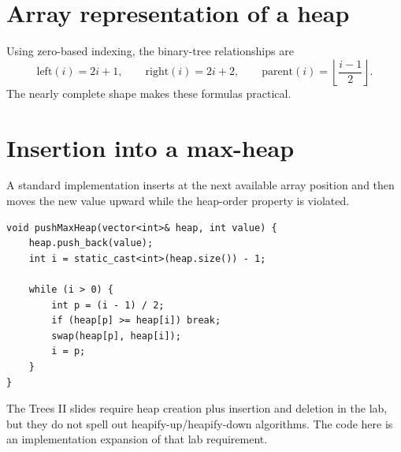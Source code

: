 \begin{mlfigure}
\end{mlfigure}

\section{Array representation of a heap}

Using zero-based indexing, the binary-tree relationships are
\[
\text{left}(i)=2i+1,\qquad \text{right}(i)=2i+2,\qquad \text{parent}(i)=\left\lfloor\frac{i-1}{2}\right\rfloor.
\]
The nearly complete shape makes these formulas practical.

\section{Insertion into a max-heap}

A standard implementation inserts at the next available array position and then moves the new value upward while the heap-order property is violated.

\begin{lstlisting}
void pushMaxHeap(vector<int>& heap, int value) {
    heap.push_back(value);
    int i = static_cast<int>(heap.size()) - 1;

    while (i > 0) {
        int p = (i - 1) / 2;
        if (heap[p] >= heap[i]) break;
        swap(heap[p], heap[i]);
        i = p;
    }
}
\end{lstlisting}

\begin{clarification}
The Trees II slides require heap creation plus insertion and deletion in the lab, but they do not spell out heapify-up/heapify-down algorithms. The code here is an implementation expansion of that lab requirement.
\end{clarification}


